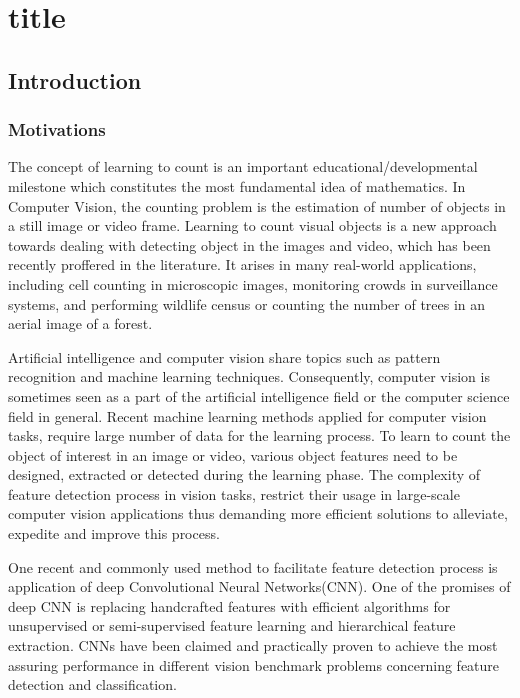 \part{title}\chapter{Introduction}
\label{sec:introduction}
\section{Motivations}
The concept of learning to count is an important educational/developmental milestone  which constitutes the most fundamental idea of mathematics. In Computer Vision\cite{umbaugh1997computer}, the counting problem is the estimation of number of objects in a still image or video frame. Learning to count visual objects is a new approach towards dealing with detecting object in the images and video, which has been recently proffered in the literature\cite{viola2005detecting, rabaud2006counting, kong2005counting, chan2008privacy, segui2015learning}. It arises in many real-world applications, including cell counting in microscopic images\cite{flaccavento2011learning}, monitoring crowds in surveillance systems\cite{rahmalan2006crowd, valera2005intelligent}, and performing wildlife census or counting the number of trees in an aerial image of a forest\cite{brandtberg1998automated, pollock1996automatic}\cite{NIPS2010_4043}. 

Artificial intelligence and computer vision share topics such as pattern recognition and machine learning\cite{michalski2013machine, mitchell1997machine} techniques. Consequently, computer vision is sometimes seen as a part of the artificial intelligence field or the computer science field in general. Recent machine learning methods applied for computer vision tasks, require large number of data for the learning process. To learn to count the object of interest in an image or video, various object features need to be designed, extracted or detected during the learning phase. The complexity of feature detection process in vision tasks, restrict their usage in large-scale computer vision applications thus demanding more efficient solutions to alleviate, expedite and improve this process. 

\indent One recent and commonly used method to facilitate feature detection process is application of deep Convolutional Neural Networks(CNN)\cite{szegedy2015going, krizhevsky2012imagenet, lecun1995convolutional, sermanet2013overfeat, ji20133d, taylor2010convolutional}. One of the promises of deep CNN is replacing handcrafted features with efficient algorithms for unsupervised or semi-supervised feature learning and hierarchical feature extraction\cite{song2013hierarchical}. CNNs have been claimed and practically proven to achieve the most assuring performance in different vision benchmark problems concerning feature detection and classification\cite{ciresan2011flexible, szegedy2015going, ciresan2012multi}. 

